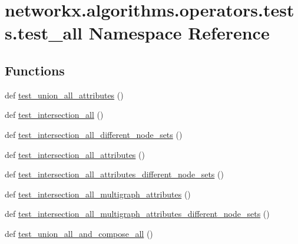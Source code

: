 \hypertarget{namespacenetworkx_1_1algorithms_1_1operators_1_1tests_1_1test__all}{}\section{networkx.\+algorithms.\+operators.\+tests.\+test\+\_\+all Namespace Reference}
\label{namespacenetworkx_1_1algorithms_1_1operators_1_1tests_1_1test__all}
\subsection*{Functions}
\begin{DoxyCompactItemize}
\item 
def \hyperlink{namespacenetworkx_1_1algorithms_1_1operators_1_1tests_1_1test__all_a0742cf23644554112c9f2d16e0a7a1b5}{test\+\_\+union\+\_\+all\+\_\+attributes} ()
\item 
def \hyperlink{namespacenetworkx_1_1algorithms_1_1operators_1_1tests_1_1test__all_aba366a2dd78a8d3cec25b53716ea4b98}{test\+\_\+intersection\+\_\+all} ()
\item 
def \hyperlink{namespacenetworkx_1_1algorithms_1_1operators_1_1tests_1_1test__all_ad748fdf780c86bd474ee502828611588}{test\+\_\+intersection\+\_\+all\+\_\+different\+\_\+node\+\_\+sets} ()
\item 
def \hyperlink{namespacenetworkx_1_1algorithms_1_1operators_1_1tests_1_1test__all_a80f4be46c5280216c72f3873a8061a3c}{test\+\_\+intersection\+\_\+all\+\_\+attributes} ()
\item 
def \hyperlink{namespacenetworkx_1_1algorithms_1_1operators_1_1tests_1_1test__all_a9e7c92bd40ab1feb885719599e4d43a4}{test\+\_\+intersection\+\_\+all\+\_\+attributes\+\_\+different\+\_\+node\+\_\+sets} ()
\item 
def \hyperlink{namespacenetworkx_1_1algorithms_1_1operators_1_1tests_1_1test__all_ac5f50919e28b442bc997e97f529e228d}{test\+\_\+intersection\+\_\+all\+\_\+multigraph\+\_\+attributes} ()
\item 
def \hyperlink{namespacenetworkx_1_1algorithms_1_1operators_1_1tests_1_1test__all_ace23cf197f95d26df8c67a1962607463}{test\+\_\+intersection\+\_\+all\+\_\+multigraph\+\_\+attributes\+\_\+different\+\_\+node\+\_\+sets} ()
\item 
def \hyperlink{namespacenetworkx_1_1algorithms_1_1operators_1_1tests_1_1test__all_aabd03288781951d29c577745d3475933}{test\+\_\+union\+\_\+all\+\_\+and\+\_\+compose\+\_\+all} ()

\end{DoxyCompactItemize}
